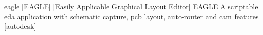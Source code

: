 \newglsXsoftware%
{eagle}%
[EAGLE]%
[Easily Applicable Graphical Layout Editor]%
{EAGLE}%
{A scriptable \gls{eda} application with schematic capture, \gls{pcb} layout, auto-router and \gls{cam} features \cite{website:Autodesk:EAGLE}}%
[autodesk]%